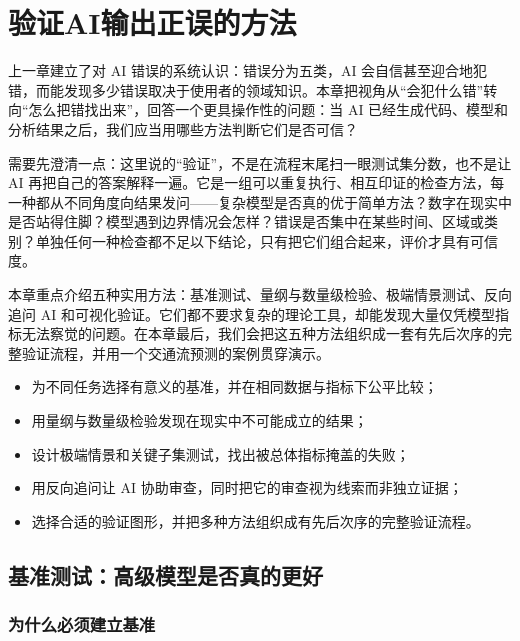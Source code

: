 \chapter{验证AI输出正误的方法}

上一章建立了对 AI 错误的系统认识：错误分为五类，AI 会自信甚至迎合地犯错，而能发现多少错误取决于使用者的领域知识。本章把视角从“会犯什么错”转向“怎么把错找出来”，回答一个更具操作性的问题：当 AI 已经生成代码、模型和分析结果之后，我们应当用哪些方法判断它们是否可信？

需要先澄清一点：这里说的“验证”，不是在流程末尾扫一眼测试集分数，也不是让 AI 再把自己的答案解释一遍。它是一组可以重复执行、相互印证的检查方法，每一种都从不同角度向结果发问——复杂模型是否真的优于简单方法？数字在现实中是否站得住脚？模型遇到边界情况会怎样？错误是否集中在某些时间、区域或类别？单独任何一种检查都不足以下结论，只有把它们组合起来，评价才具有可信度。

本章重点介绍五种实用方法：基准测试、量纲与数量级检验、极端情景测试、反向追问 AI 和可视化验证。它们都不要求复杂的理论工具，却能发现大量仅凭模型指标无法察觉的问题。在本章最后，我们会把这五种方法组织成一套有先后次序的完整验证流程，并用一个交通流预测的案例贯穿演示。

\begin{chapterguide}
\begin{itemize}
  \item 为不同任务选择有意义的基准，并在相同数据与指标下公平比较；
  \item 用量纲与数量级检验发现在现实中不可能成立的结果；
  \item 设计极端情景和关键子集测试，找出被总体指标掩盖的失败；
  \item 用反向追问让 AI 协助审查，同时把它的审查视为线索而非独立证据；
  \item 选择合适的验证图形，并把多种方法组织成有先后次序的完整验证流程。
\end{itemize}
\end{chapterguide}

\section{基准测试：高级模型是否真的更好}

\subsection{为什么必须建立基准}

